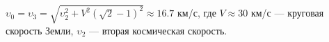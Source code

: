 $\upsilon_0=\upsilon_3=\sqrt{\upsilon^2_2+V^2(\sqrt{2}-1)^2}\approx16.7$ км/с, где $V\approx30$ км/с --- круговая скорость Земли,
$\upsilon_2$ --- вторая космическая скорость.
